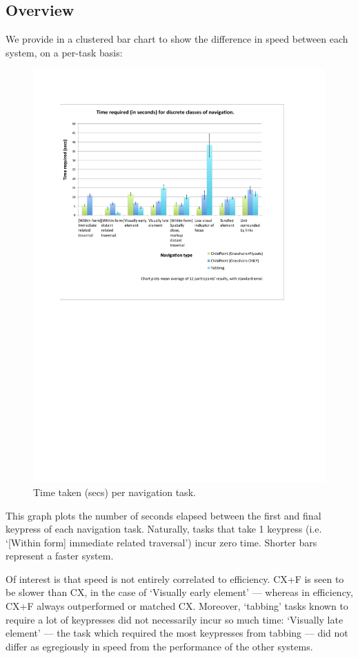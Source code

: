 \documentclass[a4paper, 12pt]{report}
\begin{document}
\subsection{Overview}
We provide in  a clustered bar chart to show the difference in speed between each system, on a per-task basis:
\begin{figure}[ht]
\centerline{\includegraphics[width=8in]{figures/TimeGraph2.pdf}}
\caption{Time taken (secs) per navigation task.}
\label{fig:speed}
\end{figure}

This graph plots the number of seconds elapsed between the first and final keypress of each navigation task. Naturally, tasks that take 1 keypress (i.e. `[Within form] immediate related traversal') incur zero time. Shorter bars represent a faster system.

Of interest is that speed is not entirely correlated to efficiency. CX+F is seen to be slower than CX, in the case of `Visually early element' --- whereas in efficiency, CX+F always outperformed or matched CX. Moreover, `tabbing' tasks known to require a lot of keypresses did not necessarily incur so much time: `Visually late element' --- the task which required the most keypresses from tabbing --- did not differ as egregiously in speed from the performance of the other systems.
\end{document}
